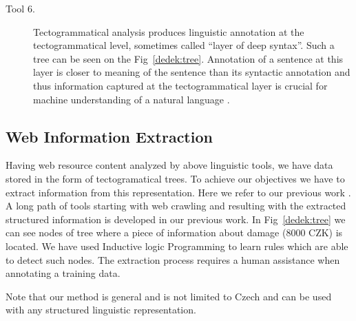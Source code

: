 \begin{multicols}{2}
\begin{description}
	\item[Tool 6.] Tectogrammatical analysis produces linguistic annotation
at the tectogrammatical level, sometimes called
``layer of deep syntax''. Such a tree can be seen on
the Fig~\ref{dedek:tree}. Annotation of a sentence at this layer
is closer to meaning of the sentence than its syntactic
annotation and thus information captured at the tectogrammatical
layer is crucial for machine understanding
of a natural language \cite{dedek:KlTransformationBasedTectogrammatical2006}.
\end{description}

\subsection{Web Information Extraction}

Having web resource content analyzed by above linguistic tools, we have data stored in the form of tectogramatical trees. To achieve our objectives we have to extract information from this representation. 
Here we refer to our previous work \cite{dedek:DeVoLinguisticextraction2008,dedek:DeVoComputingaggregations2008,dedek:DeEcExperimentswith2008}. A long path of tools starting with web crawling and resulting with the extracted structured information is developed in our previous work. 
In Fig~\ref{dedek:tree} we can see nodes of tree where a piece of information about damage (8000 CZK) is located. We have used Inductive logic Programming to learn rules which are able to detect such nodes. 
The extraction process requires a human assistance when annotating a training data.

Note that our method is general and is not limited to Czech and can be used with any structured linguistic representation. 



\end{multicols}
